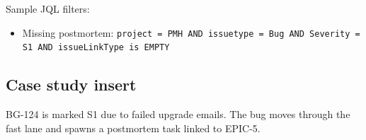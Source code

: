 Sample JQL filters:
\begin{itemize}
  \item Missing postmortem: \texttt{project = PMH AND issuetype = Bug AND Severity = S1 AND issueLinkType is EMPTY}
\end{itemize}

\subsection{Case study insert}
BG-124 is marked S1 due to failed upgrade emails. The bug moves through the fast lane and spawns a postmortem task linked to EPIC-5.






